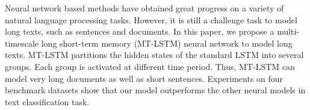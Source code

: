 Neural network based methods have obtained great progress on a variety of natural language processing tasks. However, it is still a challenge task to model long texts, such as sentences and documents. In this paper, we propose a multi-timescale long short-term memory (MT-LSTM) neural network to model long texts. MT-LSTM partitions the hidden states of the standard LSTM into several groups. Each group is activated at different time period. Thus, MT-LSTM can model very long documents as well as short sentences. Experiments on four benchmark datasets show that our model outperforms the other neural models in text classification task.
